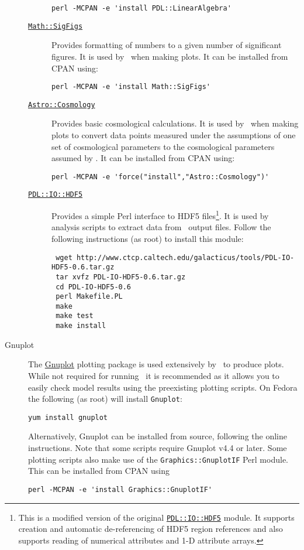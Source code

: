 \begin{description}
\begin{description}
\begin{verbatim}
perl -MCPAN -e 'install PDL::LinearAlgebra'
\end{verbatim}
  \item [\href{http://search.cpan.org/~sbeck/Math-SigFigs-1.09/lib/Math/SigFigs.pod}{{\tt Math::SigFigs}}] Provides formatting of numbers to a given number of significant figures. It is used by \glc\ when making plots. It can be installed from CPAN using:
\begin{verbatim}
perl -MCPAN -e 'install Math::SigFigs'
\end{verbatim}
  \item [\href{http://search.cpan.org/~djburke/Astro-Cosmology-0.90/Cosmology.pm}{{\tt Astro::Cosmology}}] Provides basic cosmological calculations. It is used by \glc\ when making plots to convert data points measured under the assumptions of one set of cosmological parameters to the cosmological parameters assumed by \glc. It can be installed from CPAN using:
\begin{verbatim}
perl -MCPAN -e 'force("install","Astro::Cosmology")'
\end{verbatim}
  \item [\href{http://www.ctcp.caltech.edu/galacticus/tools/PDL-IO-HDF5-0.6.tar.gz}{{\tt PDL::IO::HDF5}}] Provides a simple Perl interface to HDF5 files\footnote{This is a modified version of the  original \protect\href{http://search.cpan.org/~cerney/PDL-IO-HDF5-0.6/}{{\tt PDL::IO::HDF5}} module. It supports creation and automatic de-referencing of HDF5 region references and also supports reading of numerical attributes and 1-D attribute arrays.}. It is used by analysis scripts to extract data from \glc\ output files. Follow the following instructions (as root) to install this module:
\begin{verbatim}
 wget http://www.ctcp.caltech.edu/galacticus/tools/PDL-IO-HDF5-0.6.tar.gz
 tar xvfz PDL-IO-HDF5-0.6.tar.gz
 cd PDL-IO-HDF5-0.6
 perl Makefile.PL
 make
 make test
 make install
\end{verbatim}
\end{description}

\item[Gnuplot] The \href{http://www.gnuplot.info/}{\sc Gnuplot} plotting package is used extensively by \glc\ to produce plots. While not required for running \glc\ it is recommended as it allows you to easily check model results using the preexisting plotting scripts. On Fedora the following (as root) will install {\tt Gnuplot}:
\begin{verbatim}
yum install gnuplot
\end{verbatim}
Alternatively, {\sc Gnuplot} can be installed from source, following the online instructions. Note that some scripts require {\sc Gnuplot} v4.4 or later. Some plotting scripts also make use of the {\tt Graphics::GnuplotIF} Perl module. This can be installed from CPAN using
\begin{verbatim}
perl -MCPAN -e 'install Graphics::GnuplotIF'
\end{verbatim}


\end{description}
